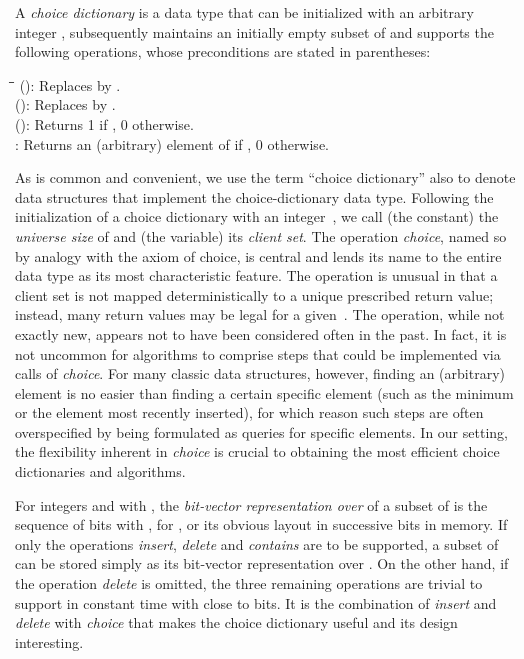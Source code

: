 \documentclass[envcountsame,envcountsect,undated,nolinenumbers]{lnthi}
\def\Tvn#1{\hbox{\textit{#1\/}}}
\begin{document}
\begin{definition}
\label{def:choice}A \emph{choice dictionary} is a data type that
can be initialized with an arbitrary integer
,
subsequently maintains
an initially empty subset  of 
and supports the following operations,
whose preconditions are stated in
parentheses:

\begin{tabbing}
\quad\=\hskip 2.4cm\=\hskip 2cm\=\kill
\>\>():\>
Replaces  by .\\
\>\>():\>
Replaces  by .\\
\>\>():\>
Returns 1 if , 0 otherwise.\\
\>:\>
\>Returns an (arbitrary) element of 
if , 0 otherwise.
\end{tabbing}
\end{definition}

As is common and convenient, we use the term
``choice dictionary'' also to denote data structures
that implement the choice-dictionary data type.
Following the initialization of a choice dictionary
 with an integer~,
we call (the constant)  the \emph{universe size}
of  and (the variable)  its
\emph{client set}.
The operation \Tvn{choice}, named so by
analogy with the axiom of choice, is central
and lends its name to the entire data type
as its most characteristic feature.
The operation is unusual in that a client set  is
not mapped deterministically to a unique
prescribed return value;
instead, many return values may be legal for a given~.
The operation, while not exactly new,
appears not to have been considered often in the past.
In fact, it is not uncommon for algorithms to comprise
steps that could be implemented via calls of \Tvn{choice}.
For many classic data structures, however, finding
an (arbitrary) element is no easier than finding
a certain specific element
(such as the minimum or the element most
recently inserted), for which reason such steps are often
overspecified by being formulated as queries for
specific elements.
In our setting, the flexibility inherent in
\Tvn{choice} is crucial to obtaining the most
efficient choice dictionaries and algorithms.

For integers  and  with ,
the \emph{bit-vector representation over
} of a subset
 of  is the sequence
 of  bits with
, for ,
or its obvious layout in  successive bits in memory.
If only the operations \Tvn{insert}, \Tvn{delete}
and \Tvn{contains} are to be supported,
a subset  of  can be
stored simply as its bit-vector representation over .
On the other hand, if
the operation \Tvn{delete} is omitted, the three
remaining operations are trivial to support in constant time
with close to  bits.
It is the combination of \Tvn{insert} and
\Tvn{delete} with \Tvn{choice} that makes
the choice dictionary useful and its design interesting.
\end{document}
